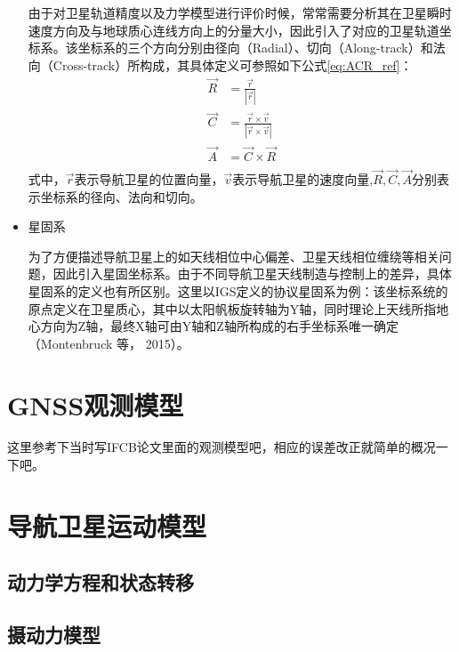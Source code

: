 \begin{itemize}
    由于对卫星轨道精度以及力学模型进行评价时候，常常需要分析其在卫星瞬时速度方向及与地球质心连线方向上的分量大小，因此引入了对应的卫星轨道坐标系。该坐标系的三个方向分别由径向（Radial）、切向（Along-track）和法向（Cross-track）所构成，其具体定义可参照如下公式\eqref{eq:ACR_ref}：
    \begin{equation}
        \begin{aligned}
        \vec{R} & =\frac{\vec{r}}{|\vec{r}|} \\
        \vec{C} & =\frac{\vec{r}\times\vec{v}}{|\vec{r}\times\vec{v}|} \\
        \vec{A} & =\vec{C}\times\vec{R} \\
        \end{aligned}
        \label{eq:ACR_ref}
    \end{equation}
    式中，\(\vec{r}\)表示导航卫星的位置向量，\(\vec{v}\)表示导航卫星的速度向量,\(\vec{R},\vec{C},\vec{A}\)分别表示坐标系的径向、法向和切向。

    \item 星固系

    为了方便描述导航卫星上的如天线相位中心偏差、卫星天线相位缠绕等相关问题，因此引入星固坐标系。由于不同导航卫星天线制造与控制上的差异，具体星固系的定义也有所区别。这里以IGS定义的协议星固系为例：该坐标系统的原点定义在卫星质心，其中以太阳帆板旋转轴为Y轴，同时理论上天线所指地心方向为Z轴，最终X轴可由Y轴和Z轴所构成的右手坐标系唯一确定（Montenbruck 等， 2015）。


\end{itemize}

\section{GNSS观测模型}

这里参考下当时写IFCB论文里面的观测模型吧，相应的误差改正就简单的概况一下吧。

\section{导航卫星运动模型}

\subsection{动力学方程和状态转移}

\subsection{摄动力模型}

